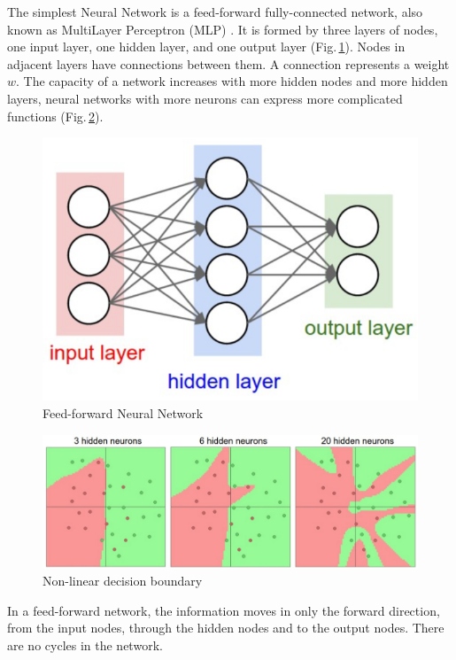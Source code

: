 The simplest Neural Network is a feed-forward fully-connected network, also known as MultiLayer Perceptron (MLP) \citep{Orbach1962}. It is formed by three layers of nodes, one input layer, one hidden layer, and one output layer (Fig.\,\ref{one_layer}). Nodes in adjacent layers have connections between them. A connection represents a weight $w$. The capacity of a network increases with more hidden nodes and more hidden layers, neural networks with more neurons can express more complicated functions (Fig.\,\ref{anyfunction}).

\begin{figure}[h]
	\centering
	\includegraphics[scale=0.5]{Figs/1hidden.png}
    \caption{Feed-forward Neural Network  \citep{cs231n}}
    \label{one_layer}
\end{figure}

\begin{figure}[h]
	\centering
	\includegraphics[scale=0.5]{Figs/anyfunction.png}
    \caption{Non-linear decision boundary \citep{cs231n}}
    \label{anyfunction}
\end{figure}

In a feed-forward network, the information moves in only the forward direction, from the input nodes, through the hidden nodes and to the output nodes. There are no cycles in the network.

